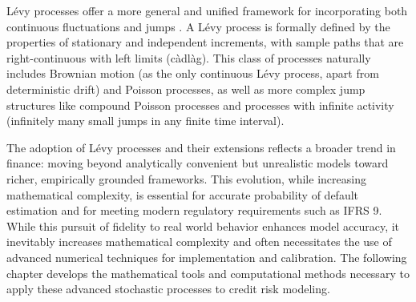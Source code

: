 \documentclass[11pt,twoside,openright]{report}
\begin{document}
Lévy processes offer a more general and unified framework for incorporating both continuous fluctuations and jumps \cite{applebaum2009levy, kyprianou2006introductory}. A Lévy process is formally defined by the properties of stationary and independent increments, with sample paths that are right-continuous with left limits (càdlàg). This class of processes naturally includes Brownian motion (as the only continuous Lévy process, apart from deterministic drift) and Poisson processes, as well as more complex jump structures like compound Poisson processes and processes with infinite activity (infinitely many small jumps in any finite time interval).

The adoption of Lévy processes and their extensions reflects a broader trend in finance: moving beyond analytically convenient but unrealistic models toward richer, empirically grounded frameworks. This evolution, while increasing mathematical complexity, is essential for accurate probability of default estimation and for meeting modern regulatory requirements such as IFRS 9. While this pursuit of fidelity to real world behavior enhances model accuracy, it inevitably increases mathematical complexity and often necessitates the use of advanced numerical techniques for implementation and calibration. The following chapter develops the mathematical tools and computational methods necessary to apply these advanced stochastic processes to credit risk modeling.


\end{document}
